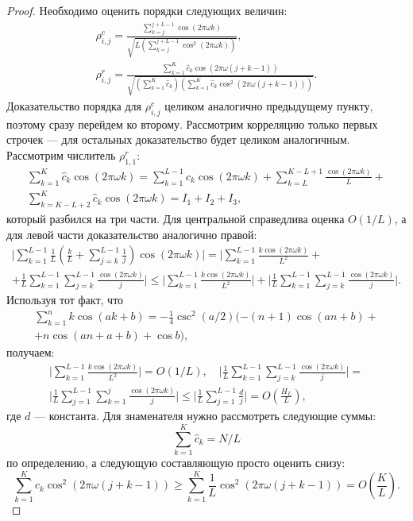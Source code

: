 \documentclass[12pt,a4paper,fleqn,leqno]{article}
\begin{document}
\begin{proof}
Необходимо оценить порядки следующих величин:
\begin{gather*}
\rho^c_{i,j} = \frac{\sum_{k=j}^{j + L - 1} \cos(2 \pi \omega k)}{\sqrt{L (\sum_{k=j}^{j + L - 1} \cos^2(2 \pi \omega k))}}, \\ \rho^r_{i,j} = \frac{\sum_{k=1}^K \hat c_k\cos(2 \pi \omega (j + k - 1))}{\sqrt{(\sum_{k=1}^K \hat c_k) (\sum_{k=1}^K \hat c_k\cos^2(2 \pi \omega (j + k - 1)))}}.
\end{gather*}
Доказательство порядка для $\rho^c_{i,j}$ целиком аналогично предыдущему пункту, поэтому сразу перейдем ко второму. Рассмотрим корреляцию только первых строчек --- для остальных доказательство будет целиком аналогичным. Рассмотрим числитель $\rho^r_{1,1}$:
\begin{gather*}
\sum_{k=1}^K \hat c_k\cos(2 \pi \omega k) = \sum_{k=1}^{L-1} \hat c_k\cos(2 \pi \omega k) + \sum_{k=L}^{K - L + 1} \frac{\cos(2 \pi \omega k)}{L} +\\ \sum_{k=K - L + 2}^{K} \hat c_k\cos(2 \pi \omega k) = I_1 + I_2 + I_3,
\end{gather*}
который разбился на три части. Для центральной справедлива оценка $O(1/L)$, а для левой части доказательство аналогично правой:
\begin{gather*}
\bigg|\sum_{k=1}^{L-1}\frac{1}{L}\left(\frac{k}{L} + \sum_{j=k}^{L-1} \frac{1}{j} \right) \cos(2 \pi \omega k)\bigg| = \bigg|\sum_{k=1}^{L-1} \frac{k \cos(2 \pi \omega k)}{L^2} + \\ + \frac{1}{L}\sum_{k = 1}^{L-1}\sum_{j = k}^{L-1}\frac{\cos(2 \pi \omega k)}{j}\bigg| \le
\bigg|\sum_{k=1}^{L-1} \frac{k \cos(2 \pi \omega k)}{L^2}\bigg| + \bigg|\frac{1}{L}\sum_{k = 1}^{L-1}\sum_{j = k}^{L-1}\frac{\cos(2 \pi \omega k)}{j}\bigg|.
\end{gather*}
Используя тот факт, что
\begin{gather*}
\sum_{k=1}^n k \cos(ak + b) = -\frac{1}{4}\csc^2(a/2)(-(n+1)\cos(an+b) + \\ + n\cos(an + a + b) + \cos b),
\end{gather*}
получаем:
\begin{gather*}
\bigg|\sum_{k=1}^{L-1} \frac{k \cos(2 \pi \omega k)}{L^2}\bigg| = O(1/L), \quad
\bigg|\frac{1}{L}\sum_{k = 1}^{L-1}\sum_{j = k}^{L-1}\frac{\cos(2 \pi \omega k)}{j}\bigg| = \\ \bigg|\frac{1}{L}\sum_{j = 1}^{L-1}\sum_{k = 1}^{j}\frac{\cos(2 \pi \omega k)}{j}\bigg| \le \bigg|\frac{1}{L}\sum_{j = 1}^{L-1}\frac{d}{j}\bigg| = O \left(\frac{H_L}{L} \right),
\end{gather*}
где $d$ --- константа. Для знаменателя нужно рассмотреть следующие суммы:
\begin{equation*}
\sum_{k=1}^K \hat c_k = N / L
\end{equation*}
по определению, а следующую составляющую просто оценить снизу:
\begin{equation*}
\sum_{k=1}^K \hat c_k\cos^2(2 \pi \omega (j + k - 1)) \ge \sum_{k=1}^K \frac{1}{L}\cos^2(2 \pi \omega (j + k - 1)) = O \left(\frac{K}{L} \right).
\end{equation*}
\end{proof}
\end{document}
